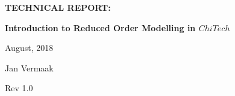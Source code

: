 \documentclass[11pt,letterpaper,titlepage]{article}
\begin{document}
\newcommand{\NSCDOCNUMBR}{NSC-REP-15-X}         %
\newcommand{\NSCDOCSUBJT}{TECHNICAL REPORT: }   %
\newcommand{\NSCDOCTITLE}{Introduction to Reduced Order Modelling in $ChiTech$}       %
\newcommand{\NSCDOCDATE} {August, 2018}    %
\newcommand{\NSCDOCREV}  {Rev 1.0} %



\begin{titlepage}
	\pagestyle{fancy}
	\vspace*{1.0cm}
	\centering
	\vspace{1cm}
	\vspace{.25cm}
	{\Large\bfseries  \NSCDOCSUBJT \par} 
	{\Large\bfseries \NSCDOCTITLE  \par}
	\vspace{1cm}
	{\Large \NSCDOCDATE \par}
	\vspace{1.0cm}
	{\Large Jan Vermaak \par}
	{\Large \NSCDOCREV \par}
		

	\begin{center}
		\begin{minipage}[c]{0.45\textwidth}
			\begin{figure}[H]
			

\end{figure}
\end{minipage}
\end{center}
\end{titlepage}
\end{document}
